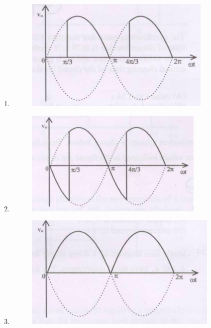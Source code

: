 \documentclass[journal,12pt,onecolumn]{IEEEtran}
\theoremstyle{remark}
\begin{document}
\begin{enumerate}[start=1, label=Q.\arabic*]
\begin{enumerate}
    \item 
    \begin{figure}[H]
        \includegraphics[width=\columnwidth]{Fig/q56-B.png}\caption{}
    \end{figure}

    
    \item 
    \begin{figure}[H]
        \includegraphics[width=\columnwidth]{Fig/q56-C.png}\caption{}
    \end{figure}


    \item 
    \begin{figure}[H]
        \includegraphics[width=\columnwidth]{Fig/q56-D.png}\caption{}
    \end{figure}





\end{enumerate}
\end{enumerate}
\end{document}

